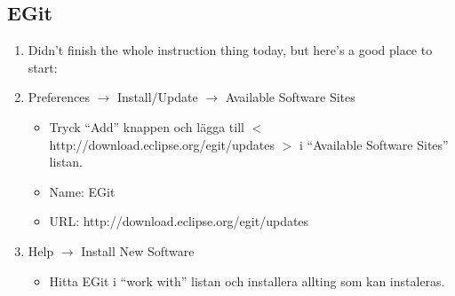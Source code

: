 \documentclass[11pt]{amsart}
\begin{document}
\subsection{EGit}
\begin{enumerate}
\item[] Didn't finish the whole instruction thing today, but here's a good place to start:  
{}

\item Preferences $\rightarrow$ Install/Update $\rightarrow$ Available Software Sites
	\begin{itemize}
	\item Tryck ``Add'' knappen och l\"{a}gga till $<$ http://download.eclipse.org/egit/updates $>$ i ``Available Software Sites'' listan. 
	\item Name: EGit 
	\item URL: http://download.eclipse.org/egit/updates
	\end{itemize}

\item Help $\rightarrow$ Install New Software
	\begin{itemize}
	\item Hitta EGit i ``work with'' listan och installera allting som kan
	instaleras.
	\end{itemize}
	



\end{enumerate}
\end{document}
